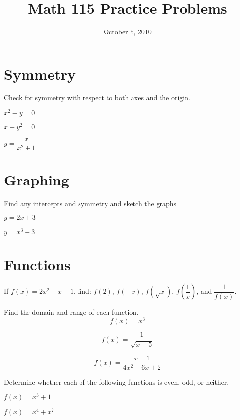 \documentclass[fleqn,addpoints]{exam}
\title{Math 115 Practice Problems}
\date{October 5, 2010}
\begin{document}
\maketitle



\section{Symmetry}

Check for symmetry with respect to both axes and the origin.

\begin{questions}
\question \(x^2 - y = 0 \)
\vspace{1cm}

\question \(x - y^2 = 0 \)
\vspace{1cm}

\question \(y = \dfrac{x}{x^2+1} \)
\vspace{1cm}

\section{Graphing}
Find any intercepts and symmetry and sketch the graphs

\question \( y = 2x + 3 \) 
\begin{solution}[3cm]
\end{solution}

\question \( y = x^3 + 3 \)
\begin{solution}[3cm]
\end{solution}

\section{Functions}

\question 
If $f(x) = 2x^2 - x + 1$, find: $f(2)$, $f(-x)$, $f(\sqrt{x})$, $f \left( \dfrac{1}{x} \right)$, and $\dfrac{1}{f(x)}$.
\vspace{3cm}

Find the domain and range of each function.
\question 
\[
  f(x) = x^3
\]
\vspace{1.5cm}

\question 
\[
  f(x) = \frac{1}{\sqrt{x - 5}}
\]
\vspace{1.5cm}

\question 
\[
  f(x) = \dfrac{x-1}{4x^2+6x+2}
\]
\vspace{1.5cm}

Determine whether each of the following functions is even, odd, or neither.

\question \(f(x) = x^3 + 1 \)
\vspace{1.5cm}

\question \(f(x) = x^4 + x^2 \)
\vspace{1.5cm}

\end{questions}
\end{document}
